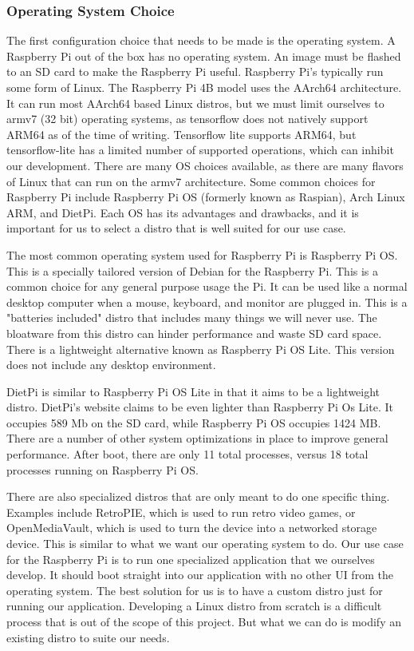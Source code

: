 \subsubsection{Operating System Choice}

The first configuration choice that needs to be made is the operating system. A Raspberry
Pi out of the box has no operating system. An image must be flashed to an SD card to make
the Raspberry Pi useful. Raspberry Pi's typically run some form of Linux. The Raspberry Pi
4B model uses the AArch64 architecture. It can run most AArch64 based Linux distros, but
we must limit ourselves to armv7 (32 bit) operating systems, as tensorflow does not
natively support ARM64 as of the time of writing. Tensorflow lite supports ARM64, but
tensorflow-lite has a limited number of supported operations, which can inhibit our
development. There are many OS choices available, as there are many flavors of Linux that
can run on the armv7 architecture. Some common choices for Raspberry Pi include Raspberry
Pi OS (formerly known as Raspian), Arch Linux ARM, and DietPi. Each OS has its advantages
and drawbacks, and it is important for us to select a distro that is well suited for our
use case.

The most common operating system used for Raspberry Pi is Raspberry Pi OS. This is a
specially tailored version of Debian for the Raspberry Pi. This is a common choice for any
general purpose usage the Pi. It can be used like a normal desktop computer when a mouse,
keyboard, and monitor are plugged in. This is a "batteries included" distro that includes
many things we will never use. The bloatware from this distro can hinder performance and
waste SD card space. There is a lightweight alternative known as Raspberry Pi OS Lite.
This version does not include any desktop environment.

DietPi is similar to Raspberry Pi OS Lite in that it aims to be a lightweight distro.
DietPi's website claims to be even lighter than Raspberry Pi Os Lite. It occupies 589 Mb
on the SD card, while Raspberry Pi OS occupies 1424 MB. There are a number of other system
optimizations in place to improve general performance. After boot, there are only 11 total
processes, versus 18 total processes running on Raspberry Pi OS.

There are also specialized distros that are only meant to do one specific thing. Examples
include RetroPIE, which is used to run retro video games, or OpenMediaVault, which is used
to turn the device into a networked storage device. This is similar to what we want our
operating system to do. Our use case for the Raspberry Pi is to run one specialized
application that we ourselves develop. It should boot straight into our application with
no other UI from the operating system. The best solution for us is to have a custom distro
just for running our application. Developing a Linux distro from scratch is a difficult
process that is out of the scope of this project. But what we can do is modify an existing
distro to suite our needs.


